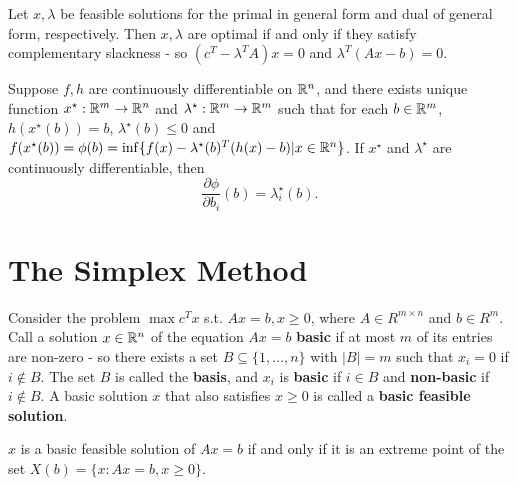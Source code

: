 \begin{thm}
  \label{sec:linear-programming-5}
  Let $x, \lambda$ be feasible solutions for the primal in general
  form and dual of general form, respectively.  Then $x, \lambda$ are
  optimal if and only if they satisfy complementary slackness - so
  $(c^{T} - \lambda^{T} A) x = 0$ and $\lambda^{T}(Ax - b) = 0$.
\end{thm}

\begin{thm}
  \label{sec:linear-programming-6}
  Suppose $f, h$ are continuously differentiable on $\mathbb{R}^{n}$, and
  there exists unique function $x^{\star}: \mathbb{R}^{m} \rightarrow \mathbb{R}^{n}$
  and $\lambda^{\star}: \mathbb{R}^{m} \rightarrow \mathbb{R}^{m}$ such that for each
  $b \in \mathbb{R}^{m}$, $h(x^{\star}(b)) = b$, $\lambda^{\star}(b) \leq 0$
  and $f(x^{\star}(b)) = \phi(b) = \inf \{ f(x) -
  \lambda^{\star}(b)^{T}(h(x) - b) | x \in \mathbb{R}^{n}\} $.  If $x^{\star}$
  and $\lambda^{\star}$ are continuously differentiable, then
  \begin{equation}
    \label{eq:3}
    \frac{\partial \phi}{\partial b_{i}} (b) = \lambda^{\star}_{i}(b).
  \end{equation}
\end{thm}

\section{The Simplex Method}
\label{sec:simplex-method}

\begin{defn}
  \label{sec:simplex-method-2}
  Consider the problem $\max c^{T} x$ s.t. $Ax = b, x \geq 0$, where
  $A \in R^{m \times n}$ and $b \in R^{m}$.  Call a solution $x \in
  \mathbb{R}^{n}$ of the equation $Ax = b$ \textbf{basic} if at most $m$ of
  its entries are non-zero - so there exists a set $B \subseteq \{ 1,
  \dots, n \}$ with $|B| = m$ such that $x_{i} = 0$ if $i \notin B$.
  The set $B$ is called the \textbf{basis}, and $x_{i}$ is
  \textbf{basic} if $i \in B$ and \textbf{non-basic} if $i \notin B$.
  A basic solution $x$ that also satisfies $x \geq 0$ is called a
  \textbf{basic feasible solution}.
\end{defn}

\begin{thm}
  \label{sec:simplex-method-3}
  $x$ is a basic feasible solution of $Ax = b$ if and only if it is an
  extreme point of the set $X(b) = \{ x : Ax = b, x \geq 0 \} $.
\end{thm}


